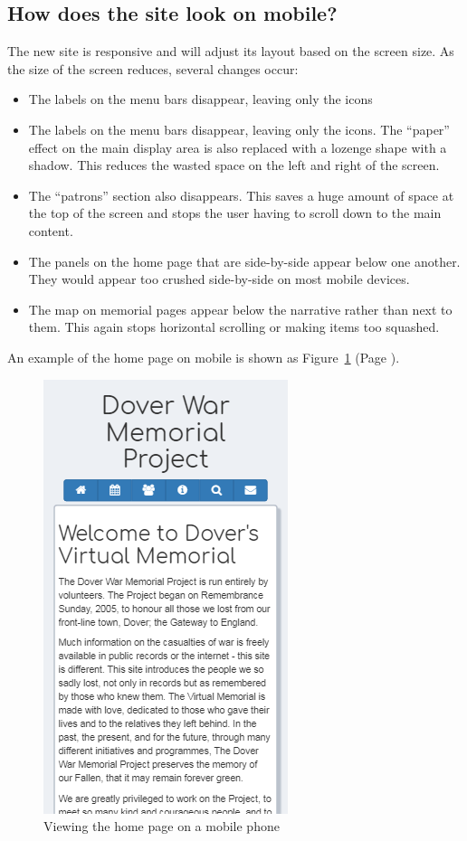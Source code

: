 \documentclass[12pt]{article}
\newcommand{\myref}[1]{\ref{#1} {\scriptsize(Page \pageref{#1})}}
\begin{document}
\subsection{How does the site look on mobile?}\label{ssec:mobile}
The new site is responsive and will adjust its layout based on the screen size. As the size of the screen reduces, several changes occur:
\begin{itemize}
\item The labels on the menu bars disappear, leaving only the icons
\item The labels on the menu bars disappear, leaving only the icons. The ``paper'' effect on the main display area is also replaced with a lozenge shape with a shadow. This reduces the wasted space on the left and right of the screen.
\item The ``patrons'' section also disappears. This saves a huge amount of space at the top of the screen and stops the user having to scroll down to the main content.
\item The panels on the home page that are side-by-side appear below one another. They would appear too crushed side-by-side on most mobile devices.
\item The map on memorial pages appear below the narrative rather than next to them. This again stops horizontal scrolling or making items too squashed.
\end{itemize}
An example of the home page on mobile is shown as Figure~\myref{fig:mobile}.

\begin{figure}[h]
  \centering
 \includegraphics[height=.45\textheight]{pics/mobile.png}
	\caption{Viewing the home page on a mobile phone}\label{fig:mobile}
\end{figure}
\end{document}
